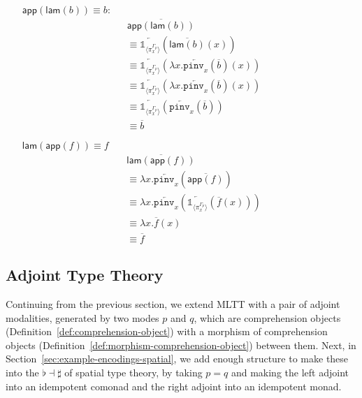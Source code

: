 \documentclass[10pt]{article}
\theoremstyle{definition}
\newcommand{\rewrite}[2]{\overleftarrow{#1}(#2)}
\newcommand\UE[2]{\ensuremath{#1(#2)}}
\newcommand\UI[2]{\ensuremath{\lambda #1.#2}}
\newcommand{\modeof}[1]{{#1}_p}
\newcommand{\upstairs}[1]{\overline{#1}}
\newcommand\One{\ensuremath{\mathds{1}}}
\newcommand\ApOne[1]{\ensuremath{\One_{\langle {#1} \rangle }}}
\newcommand\pinv[1]{\ensuremath{\mathtt{pinv}_{#1}}}
\newcommand\qapp[1]{\ensuremath{\mathsf{app}({#1})}}
\newcommand\qlam[1]{\ensuremath{\mathsf{lam}({#1})}}
\begin{document}
\begin{enumerate}[style = multiline, labelwidth = 80pt]
\item[{$\qapp{\qlam{b}} \equiv b$}:] 
\begin{align*}
&\upstairs{\qapp{\qlam{b}}} \\
&\equiv \rewrite{\ApOne{\pi^{\modeof{\Gamma}}_x}}{\UE{\upstairs{\qlam{b}}}{x}} \\
&\equiv \rewrite{\ApOne{\pi^{\modeof{\Gamma}}_x}}{\UE{\UI{x}{\rewrite{\pinv{x}}{\upstairs{b}}}}{x}} \\
&\equiv \rewrite{\ApOne{\pi^{\modeof{\Gamma}}_x}}{\UE{\UI{x}{\rewrite{\pinv{x}}{\upstairs{b}}}}{x}} \\
&\equiv \rewrite{\ApOne{\pi^{\modeof{\Gamma}}_x}}{\rewrite{\pinv{x}}{\upstairs{b}}} \\
&\equiv \upstairs{b}
\end{align*}

\item[{$\qlam{\qapp{f}} \equiv f$}]
\begin{align*}
&\upstairs{\qlam{\qapp{f}}} \\
&\equiv \UI{x}{\rewrite{\pinv{x}}{\upstairs{\qapp{f}}}} \\
&\equiv \UI{x}{\rewrite{\pinv{x}}{\rewrite{\ApOne{\pi^{\modeof{\Gamma}}_x}}{\UE{\upstairs{f}}{x}}}} \\
&\equiv \UI{x}{\UE{\upstairs{f}}{x}} \\
&\equiv \upstairs{f}
\end{align*}
\end{enumerate}

\subsection{Adjoint Type Theory}

Continuing from the previous section, we extend MLTT with a pair of
adjoint modalities, generated by two modes $p$ and $q$, which are
comprehension objects (Definition~\ref{def:comprehension-object}) with a
morphism of comprehension objects
(Definition~\ref{def:morphism-comprehension-object}) between them.
Next, in Section~\ref{sec:example-encodings-spatial}, we add enough
structure to make these into the $\flat \dashv \sharp$ of spatial type
theory, by taking $p = q$ and making the left adjoint into an idempotent
comonad and the right adjoint into an idempotent monad.
\end{document}
